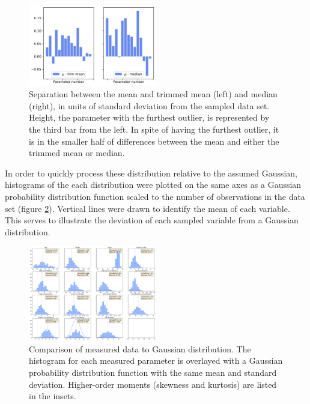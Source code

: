 \documentclass{IEEEtran}
\begin{document}
\begin{centering}
\begin{figure}
\centering
\begin{center}
	\includegraphics[width=0.5\textwidth]{robust_statistics}
	\caption{Separation between the mean and trimmed mean (left) and median (right), in units of standard deviation from the sampled data set. Height, the parameter with the furthest outlier, is represented by the third bar from the left. In spite of having the furthest outlier, it is in the smaller half of differences between the mean and either the trimmed mean or median.\label{fig:robust}}
\end{center}
\end{figure}
\end{centering}

In order to quickly process these distribution relative to the assumed Gaussian, histograms of the each distribution were plotted on the same axes as a Gaussian probability distribution function scaled to the number of observations in the data set (figure \ref{fig:gaussian_comparison}). Vertical lines were drawn to identify the mean of each variable. This serves to illustrate the deviation of each sampled variable from a Gaussian distribution.

\begin{centering}
\begin{figure}
\centering
\begin{center}
	\includegraphics[width=0.5\textwidth]{histogram_array}
	\caption{Comparison of measured data to Gaussian distribution. The histogram for each measured parameter is overlayed with a Gaussian probability distribution function with the same mean and standard deviation. Higher-order moments (skewness and kurtosis) are listed in the insets.\label{fig:gaussian_comparison}}
\end{center}
\end{figure}
\end{centering}
\end{document}
